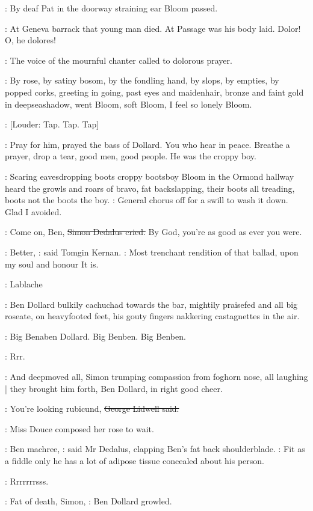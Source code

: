 :
By deaf Pat in the doorway
straining ear Bloom passed.

\BloomInt:
At Geneva barrack that young man died.
At Passage was his body
laid.
Dolor!
O,
he dolores!

:
The voice of the mournful chanter called to
dolorous prayer.

:
By rose,
by satiny bosom,
by the fondling hand,
by slops,
by empties,
by popped corks,
greeting in going,
past eyes and maidenhair,
bronze and
faint gold in deepseashadow,
went Bloom,
soft Bloom,
I feel so lonely
Bloom.

\stripling:
[Louder:
Tap.
Tap.
Tap]

:
Pray for him,
prayed the bass of Dollard.
You who hear in peace.
Breathe
a prayer,
drop a tear,
good men,
good people.
He was the croppy boy.

:
Scaring eavesdropping boots croppy bootsboy Bloom in the Ormond
hallway heard the growls and roars of bravo,
fat backslapping,
their boots
all treading,
boots not the boots the boy.
\BloomInt:
General chorus off for a swill
to wash it down.
Glad I avoided.

\simon:
Come on,
Ben,
\sout{Simon Dedalus cried.}
By God,
you're as good as ever you were.

:
Better,
:
said Tomgin Kernan.
:
Most trenchant rendition of that ballad,
upon my soul and honour It is.

\cowley:
Lablache

:
Ben Dollard bulkily cachuchad towards the bar,
mightily praisefed and all
big roseate,
on heavyfooted feet,
his gouty fingers nakkering castagnettes
in the air.

\BloomInt:
Big Benaben Dollard.
Big Benben.
Big Benben.

\BloomInt:
Rrr.

:
And deepmoved all,
Simon trumping compassion from foghorn nose,
all laughing |
they brought him forth,
Ben Dollard,
in right good cheer.

\lidwell:
You're looking rubicund,
\sout{George Lidwell said.}

:
Miss Douce composed her rose to wait.

\simon:
Ben machree,
:
said Mr Dedalus,
clapping Ben's fat back shoulderblade.
\simon:
Fit as a fiddle only he has a lot of adipose tissue concealed about his
person.

\BloomInt:
Rrrrrrrsss.

\dollard:
Fat of death,
Simon,
:
Ben Dollard growled.

